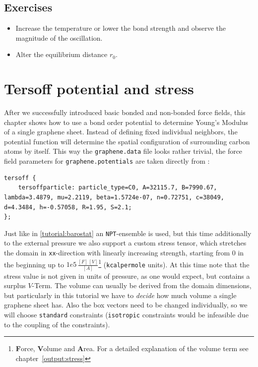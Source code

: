 \subsection{Exercises}
\begin{itemize}
    \item Increase the temperature or lower the bond strength and
        observe the magnitude of the oscillation.
    \item Alter the equilibrium distance $r_0$.
\end{itemize}

\section{Tersoff potential and stress}
After we successfully introduced basic bonded and non-bonded force fields, this
chapter shows how to use a bond order potential to determine Young's Modulus of
a single graphene sheet. Instead of defining fixed individual neighbors, the
potential function will determine the spatial configuration of surrounding
carbon atoms by itself. This way the \texttt{graphene.data} file looks rather trivial,
the force field parameters for \texttt{graphene.potentials} are taken directly
from \cite{tersoff88a}:

\begin{lstlisting}
tersoff {
    tersoffparticle: particle_type=C0, A=32115.7, B=7990.67, lambda=3.4879, mu=2.2119, beta=1.5724e-07, n=0.72751, c=38049, d=4.3484, h=-0.57058, R=1.95, S=2.1;
};
\end{lstlisting}

Just like in \ref{tutorial:barostat} an \texttt{NPT}-ensemble is used, but this time
additionally to the external pressure we also support a custom stress tensor,
which stretches the domain in \texttt{xx}-direction with linearly increasing
strength, starting from $0$ in the beginning up to $1e5\,\frac{[F]\,[V]}{[A]}$\footnote{\textbf{F}orce, \textbf{V}olume and \textbf{A}rea.
For a detailed explanation of the volume term see chapter~\ref{output:stress}}
(\texttt{kcalpermole} units). At this time note that the stress value is not
given in units of pressure, as one would expect, but contains a surplus
$V$-Term.  The volume can usually be derived from the domain dimensions, but
particularly in this tutorial we have to \emph{decide} how much volume a single
graphene sheet has. Also the box vectors need to be changed individually, so we
will choose \texttt{standard} constraints (\texttt{isotropic} constraints would be
infeasible due to the coupling of the constraints).


